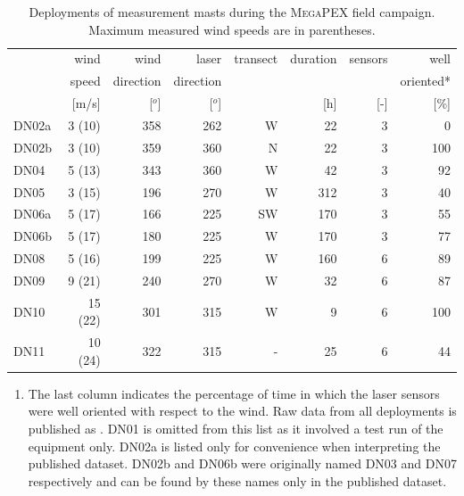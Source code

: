 \begin{table}[h]
  \centering
  \caption{Deployments of measurement masts during the \textsc{MegaPEX} field
    campaign. Maximum measured wind speeds are in parentheses.}
  \label{tab:deployments}
  \begin{tabular}[h]{lrrrrrrr}
    \hline
               & wind       &  wind      & laser      &   transect &   duration & sensors &     well \\
               & speed      & direction  & direction  &            &            &      &     oriented* \\
               &      [m/s] &     [$^o$] &     [$^o$] &            &        [h] &     [-] &       [\%] \\
    \hline
    DN02a      &     3 (10) &        358 &        262 &          W &         22 &       3 &          0 \\
    DN02b      &     3 (10) &        359 &        360 &          N &         22 &       3 &        100 \\
    DN04       &     5 (13) &        343 &        360 &          W &         42 &       3 &         92 \\
    DN05       &     3 (15) &        196 &        270 &          W &        312 &       3 &         40 \\
    DN06a      &     5 (17) &        166 &        225 &         SW &        170 &       3 &         55 \\
    DN06b      &     5 (17) &        180 &        225 &          W &        170 &       3 &         77 \\
    DN08       &     5 (16) &        199 &        225 &          W &        160 &       6 &         89 \\
    DN09       &     9 (21) &        240 &        270 &          W &         32 &       6 &         87 \\
    DN10       &    15 (22) &        301 &        315 &          W &          9 &       6 &        100 \\
    DN11       &    10 (24) &        322 &        315 &          - &         25 &       6 &         44 \\
    \hline
  \end{tabular}

  \footnotesize{
    \begin{enumerate}[{*}]
    \item The last column indicates the percentage of time in which
      the laser sensors were well oriented with respect to the wind.
      Raw data from all deployments is published as \citet{megapex}.
      DN01 is omitted from this list as it involved a test run of the
      equipment only. DN02a is listed only for convenience when
      interpreting the published dataset. DN02b and DN06b were
      originally named DN03 and DN07 respectively and can be found by
      these names only in the published dataset.
    \end{enumerate}}
\end{table}

